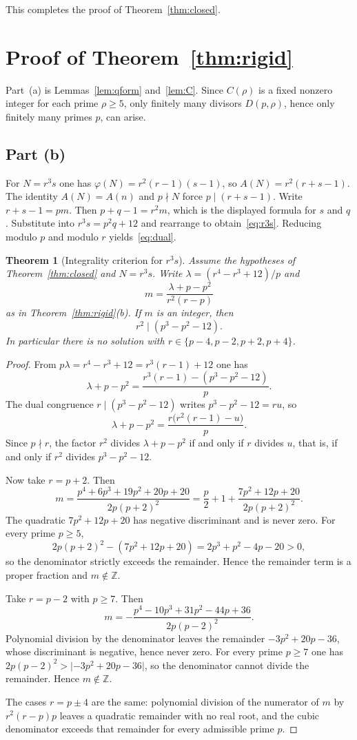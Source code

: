 \documentclass[11pt,reqno]{amsart}
\newcommand{\ph}{\varphi}
\newcommand{\Z}{\mathbb{Z}}
\newtheorem{theorem}{Theorem}
\theoremstyle{definition}
\begin{document}
This completes the proof of Theorem~\ref{thm:closed}.

\section{Proof of Theorem~\ref{thm:rigid}}
\label{sec:proof2}

Part~(a) is Lemmas~\ref{lem:qform} and~\ref{lem:C}. Since \(C(\rho)\) is a fixed nonzero integer for each prime \(\rho\ge 5\), only finitely many divisors \(D(p,\rho)\), hence only finitely many primes \(p\), can arise.

\subsection{Part (b)}
For \(N=r^3s\) one has \(\ph(N)=r^2(r-1)(s-1)\), so \(A(N)=r^2(r+s-1)\). The identity \(A(N)=A(n)\) and \(p\nmid N\) force \(p\mid(r+s-1)\). Write \(r+s-1=pm\). Then \(p+q-1=r^2m\), which is the displayed formula for \(s\) and \(q\). Substitute into \(r^3s=p^2q+12\) and rearrange to obtain~\eqref{eq:r3s}. Reducing modulo \(p\) and modulo \(r\) yields~\eqref{eq:dual}.


\begin{theorem}[Integrality criterion for \(r^3s\)]
\label{thm:r3sint}
Assume the hypotheses of Theorem~\ref{thm:closed} and \(N=r^3s\). Write
\(\lambda=(r^4-r^3+12)/p\) and
\[
m=\frac{\lambda+p-p^2}{r^2(r-p)}
\]
as in Theorem~\ref{thm:rigid}(b). If \(m\) is an integer, then
\[
r^2\mid(p^3-p^2-12).
\]
In particular there is no solution with \(r\in\{p-4,p-2,p+2,p+4\}\).
\end{theorem}

\begin{proof}
From \(p\lambda=r^4-r^3+12=r^3(r-1)+12\) one has
\[
\lambda+p-p^2=\frac{r^3(r-1)-(p^3-p^2-12)}{p}.
\]
The dual congruence \(r\mid(p^3-p^2-12)\) writes \(p^3-p^2-12=ru\), so
\[
\lambda+p-p^2=\frac{r\bigl(r^2(r-1)-u\bigr)}{p}.
\]
Since \(p\nmid r\), the factor \(r^2\) divides \(\lambda+p-p^2\) if and only if \(r\) divides \(u\), that is, if and only if \(r^2\) divides \(p^3-p^2-12\).

Now take \(r=p+2\). Then
\[
m=\frac{p^4+6p^3+19p^2+20p+20}{2p(p+2)^2}=\frac{p}{2}+1+\frac{7p^2+12p+20}{2p(p+2)^2}.
\]
The quadratic \(7p^2+12p+20\) has negative discriminant and is never zero. For every prime \(p\ge 5\),
\[
2p(p+2)^2-(7p^2+12p+20)=2p^3+p^2-4p-20>0,
\]
so the denominator strictly exceeds the remainder. Hence the remainder term is a proper fraction and \(m\notin\Z\).

Take \(r=p-2\) with \(p\ge 7\). Then
\[
m=-\frac{p^4-10p^3+31p^2-44p+36}{2p(p-2)^2}.
\]
Polynomial division by the denominator leaves the remainder \(-3p^2+20p-36\), whose discriminant is negative, hence never zero. For every prime \(p\ge 7\) one has \(2p(p-2)^2>\lvert -3p^2+20p-36\rvert\), so the denominator cannot divide the remainder. Hence \(m\notin\Z\).

The cases \(r=p\pm 4\) are the same: polynomial division of the numerator of \(m\) by \(r^2(r-p)p\) leaves a quadratic remainder with no real root, and the cubic denominator exceeds that remainder for every admissible prime \(p\).
\end{proof}
\end{document}
